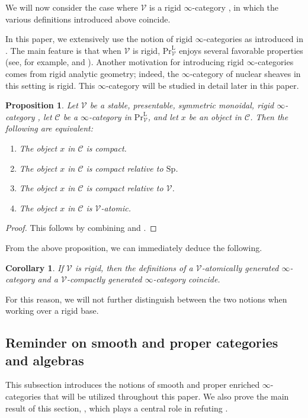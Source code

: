 \documentclass[oneside, hidelinks, 12pt, a4paper,reqno]{amsart}
\theoremstyle{plain}
\theoremstyle{definition}
\theoremstyle{plain}
\newtheorem{corollary}[corollary]{Corollary}
\newtheorem{proposition}[proposition]{Proposition}
\newcommand{\cC}{\mathscr C}
\newcommand{\cV}{\mathscr V}
\newcommand{\Sp}{\mathrm{Sp}}
\newcommand{\cat}{$\infty$-category }
\newcommand{\cates}{$\infty$-categories }
\newcommand{\LPrV}{\mathrm{Pr}^{\mathrm{L}}_{\cV}}
\begin{document}
We will now consider the case where $\cV$ is a rigid \cat, in which the various definitions introduced above coincide.

In this paper, we extensively use the notion of rigid \cates as introduced in \cite{gaitsgory2019study}. The main feature is that when $\cV$ is rigid, $\LPrV$ enjoys several favorable properties (see, for example, \cite[Chapter 1, Sec 9]{gaitsgory2019study} and \cite[Lemma 3.33]{anschutz2024descentsolidquasicoherentsheaves}). Another motivation for introducing rigid \cates comes from rigid analytic geometry; indeed, the \cat of nuclear sheaves in this setting is rigid. This \cat will be studied in detail later in this paper. 

\begin{proposition}\label{prop: compact objects over rigid categories}
    Let $\cV$ be a stable, presentable, symmetric monoidal, rigid \cat, let $\cC$ be a \cat in $\LPrV$, and let $x$ be an object in $\cC$. Then the following are equivalent:
    \begin{enumerate}
        \item The object $x$ in $\cC$ is compact.
        \item The object $x$ in $\cC$ is compact relative to $\Sp$.
        \item The object $x$ in $\cC$ is compact relative to $\cV$.
        \item The object $x$ in $\cC$ is $\cV$-atomic.
    \end{enumerate}
\end{proposition}
\begin{proof}
    This follows by combining  and \cite[Corollary 9.3.4, Lemma 9.3.6]{gaitsgory2019study}.
\end{proof}

From the above proposition, we can immediately deduce the following.

\begin{corollary}
    If $\cV$ is rigid, then the definitions of a $\cV$-atomically generated \cat and a $\cV$-compactly generated \cat coincide.
\end{corollary}

For this reason, we will not further distinguish between the two notions when working over a rigid base.

\subsection{Reminder on smooth and proper categories and algebras}
This subsection introduces the notions of smooth and proper enriched \cates that will be utilized throughout this paper. We also prove the main result of this section, , which plays a central role in refuting .
\end{document}
